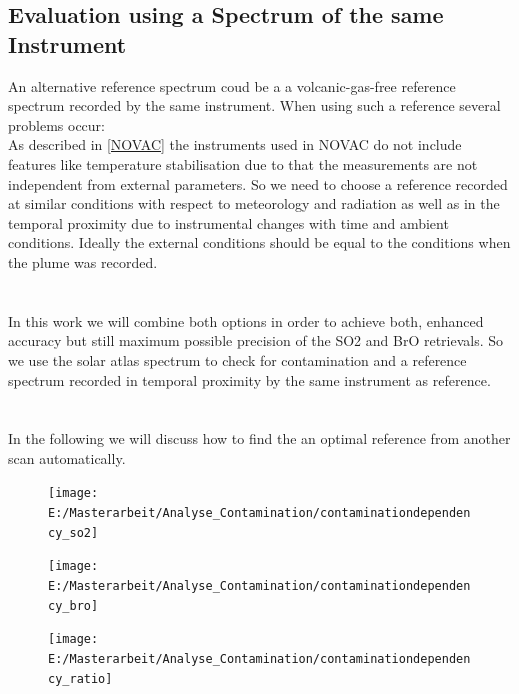 \documentclass  [
  paper    = a4,
  BCOR     = 10mm,
  twoside,
  fontsize = 12pt,
  fleqn,
  toc      = bibnumbered,
  toc      = listofnumbered,
  numbers  = noendperiod,
  headings = normal,
  listof   = leveldown,
  version  = 3.03
]                                       {scrreprt}
\begin{document}
	\subsection*{Evaluation using a Spectrum of the same Instrument}
	An alternative reference spectrum coud be a a volcanic-gas-free reference
	spectrum recorded by the same instrument. When using such a reference several problems occur:\\
	As described in \cref{NOVAC} the instruments used in NOVAC do not include features like temperature stabilisation due to that the measurements are not independent from external parameters. 
	So we need to choose a reference recorded at similar conditions with respect to meteorology and	radiation as well as in the temporal proximity due to instrumental changes with time and ambient conditions. Ideally the external conditions should be equal to the conditions when the plume was recorded.\\
	\\
	\\
	In this work we will combine both options in order to
	achieve both, enhanced accuracy but still maximum possible precision of
	the SO2 and BrO retrievals. So we use the solar atlas spectrum to check for 
	contamination and a reference spectrum recorded in temporal proximity by the same instrument as reference.\\
	\\
	\\
	In the following we will discuss how to find the an optimal reference from another scan automatically.
	
	\begin{figure}
		\centering
		\texttt{[image: E:/Masterarbeit/Analyse\_Contamination/contaminationdependency\_so2]}
		\caption{}
		\label{fig:contaminationdependencyso2}
	\end{figure}
	\begin{figure}
		\centering
		\texttt{[image: E:/Masterarbeit/Analyse\_Contamination/contaminationdependency\_bro]}
		\caption{}
		\label{fig:contaminationdependencybro}
	\end{figure}
	\begin{figure}
		\centering
		\texttt{[image: E:/Masterarbeit/Analyse\_Contamination/contaminationdependency\_ratio]}
		\caption{}
		\label{fig:contaminationdependencyratio}
	\end{figure}
\end{document}
